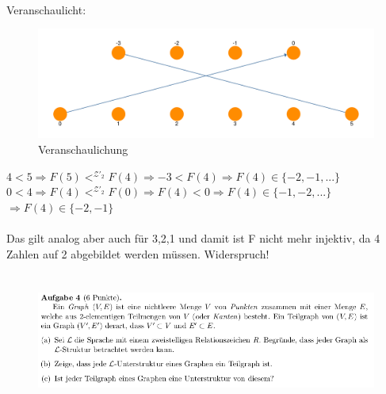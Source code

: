 \documentclass[a4paper]{scrartcl}
\begin{document}
\begin{itemize}
            \\Veranschaulicht:\\
            \begin{figure}[H]
                \centering
                \includegraphics[scale=0.3]{./3-b-drawing.pdf}
                \caption{Veranschaulichung}
                \label{fig:name}
            \end{figure}

            $4 < 5 \Rightarrow F(5) <^{\mathscr{Z'}_2} F(4) \Rightarrow -3 < F(4) \Rightarrow F(4) \in \{-2,-1,...\}$\\
            $0 < 4 \Rightarrow F(4) <^{\mathscr{Z'}_2} F(0) \Rightarrow F(4) < 0 \Rightarrow F(4) \in \{-1,-2,...\}$\\
            $\Rightarrow F(4) \in \{-2,-1\}$\\
            \\Das gilt analog aber auch für 3,2,1 und damit ist F nicht mehr injektiv, da 4 Zahlen auf 2 abgebildet werden müssen.
            Widerspruch!

    \end{itemize}

\newpage

\section*{}%
\label{sec:aufgabe_4}

\begin{figure}[H]
    \centering
    \includegraphics[scale=0.6]{./A-4.png}
    \label{fig:}
\end{figure}
\end{document}
